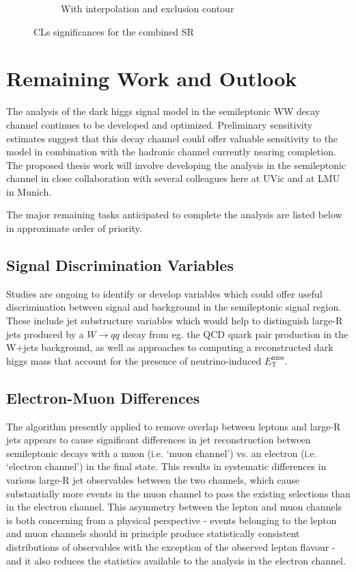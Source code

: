 \documentclass[12pt]{article}
\newcommand*{\met}{\ensuremath{E_\text{T}^\text{miss}}}
\begin{document}
\begin{figure}[H]
\begin{subfigure}[b]{0.49\textwidth}
         \caption[]{With interpolation and exclusion contour}
         \label{fig:interp_sensitivity}
     \end{subfigure}
\caption[]{CLs significances for the combined SR}
\label{fig:sensitivity_full}
\end{figure}

\newpage

\section{Remaining Work and Outlook}

The analysis of the dark higgs signal model in the semileptonic WW decay channel continues to be developed and optimized. Preliminary sensitivity estimates suggest that this decay channel could offer valuable sensitivity to the model in combination with the hadronic channel currently nearing completion. The proposed thesis work will involve developing the analysis in the semileptonic channel in close collaboration with several colleagues here at UVic and at LMU in Munich. 

The major remaining tasks anticipated to complete the analysis are listed below in approximate order of priority.

\subsection{Signal Discrimination Variables}

Studies are ongoing to identify or develop variables which could offer useful discrimination between signal and background in the semileptonic signal region. These include jet substructure variables which would help to distinguish large-R jets produced by a $W\rightarrow qq$ decay from eg. the QCD quark pair production in the W+jets background, as well as approaches to computing a reconstructed dark higgs mass that account for the presence of neutrino-induced \met. 
 
\subsection{Electron-Muon Differences}

The  algorithm presently applied to remove overlap between leptons and large-R jets appears to cause significant differences in jet reconstruction between semileptonic decays with a muon (i.e. `muon channel') vs. an electron (i.e. `electron channel') in the final state. This results in systematic differences in various large-R jet observables between the two channels, which cause substantially more events in the muon channel to pass the existing selections than in the electron channel. This asymmetry between the lepton and muon channels is both concerning from a physical perspective - events belonging to the lepton and muon channels should in principle produce statistically consistent distributions of observables with the exception of the observed lepton flavour - and it also reduces the statistics available to the analysis in the electron channel. 
\end{document}
